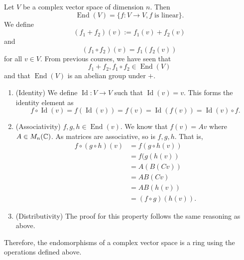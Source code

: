 \begin{example}
    Let $V$ be a complex vector space of dimension $n$. Then 
    \[ \operatorname{End}{(V)} = \{ f : V \to V, f \; \text{is linear} \}. \] 
    We define 
    \[ (f_1 + f_2)(v) := f_1(v) + f_2(v) \] 
    and 
    \[ (f_1 \circ f_2)(v) = f_1(f_2(v)) \] 
    for all $v \in V$. From previous courses, we have seen that 
    \[ f_1 + f_2, f_1 \circ f_2 \in \operatorname{End}{(V)} \] 
    and that $\operatorname{End}{(V)}$ is an abelian group under $+$.
    \begin{enumerate}
        \item (Identity) We define  $\operatorname{Id}: V \to V$ such that $\operatorname{Id}{(v)} = v$. This forms the identity element as \[ f \circ \operatorname{Id}{(v)} = f(\operatorname{Id}{(v)}) = f(v) = \operatorname{Id}{(f(v))} = \operatorname{Id}{(v)} \circ f. \]

        \item (Associativity) $f, g, h \in \operatorname{End}{(v)}$. We know that $f(v) = Av$ where $A \in M_n(\mathbb{C})$. As matrices are associative, so is $f, g, h$. That is,
            \begin{align*}
                f \circ (g \circ h)(v) &= f(g \circ h(v)) \\
                                       &= f(g(h(v)) \\
                                       &= A(B(Cv)) \\
                                       &= AB(Cv) \\
                                       &= AB(h(v)) \\
                                       &= (f \circ g)(h(v)).
            \end{align*}
        
        \item (Distributivity) The proof for this property follows the same reasoning as above.
    \end{enumerate}
    Therefore, the endomorphisms of a complex vector space is a ring using the operations defined above.
\end{example}

